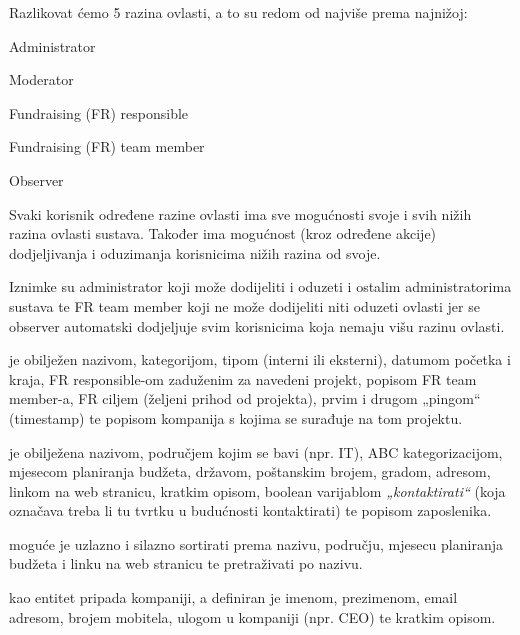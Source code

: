 		{Razlikovat ćemo 5 razina ovlasti, a to su redom od najviše prema najnižoj:}
		\begin{packed_item}
			\item {Administrator}
			\item {Moderator}
			\item {Fundraising (FR) responsible}
			\item {Fundraising (FR) team member}
			\item {Observer}
		\end{packed_item}

		{Svaki korisnik određene razine ovlasti ima sve mogućnosti svoje i svih nižih razina ovlasti sustava. Također ima mogućnost (kroz određene akcije) dodjeljivanja i oduzimanja  korisnicima nižih razina od svoje.}

		{Iznimke su administrator koji može dodijeliti i oduzeti i ostalim administratorima sustava te FR team member koji ne može dodijeliti niti oduzeti ovlasti jer se observer automatski dodjeljuje svim korisnicima koja nemaju višu razinu ovlasti.}\vspace{0.3cm}
		
		{ je obilježen nazivom, kategorijom, tipom (interni ili eksterni), datumom početka i kraja, FR responsible-om zaduženim za navedeni projekt, popisom FR team member-a, FR ciljem (željeni prihod od projekta), prvim i drugom „pingom“ (timestamp) te popisom kompanija s kojima se surađuje na tom projektu.}\vspace{0.1cm}

		{ je obilježena nazivom, područjem kojim se bavi (npr. IT), ABC kategorizacijom, mjesecom planiranja budžeta, državom, poštanskim brojem, gradom, adresom, linkom na web stranicu, kratkim opisom, boolean varijablom \textit{„kontaktirati“} (koja označava treba li tu tvrtku u budućnosti kontaktirati) te popisom zaposlenika.}\vspace{0.1cm}
		
		{ moguće je uzlazno i silazno sortirati prema nazivu, području, mjesecu planiranja budžeta i linku na web stranicu te pretraživati po nazivu.}\vspace{0.1cm}

		{ kao entitet pripada kompaniji, a definiran je imenom, prezimenom, email adresom, brojem mobitela, ulogom u kompaniji (npr. CEO) te kratkim opisom.}\vspace{0.1cm}

